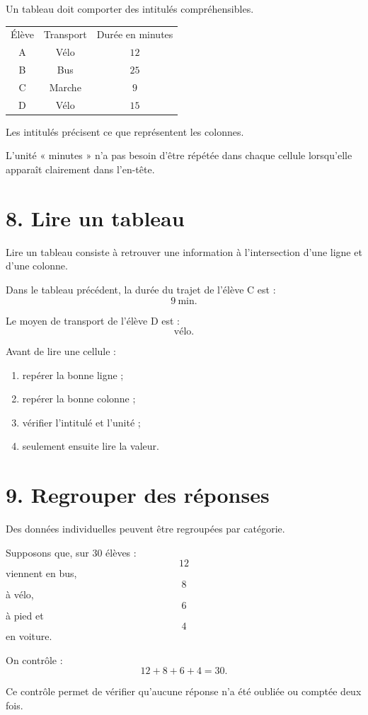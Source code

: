 Un tableau doit comporter des intitulés compréhensibles.

\begin{tabular}{c|c|c}
Élève & Transport & Durée en minutes \\
A & Vélo & $12$ \\
B & Bus & $25$ \\
C & Marche & $9$ \\
D & Vélo & $15$ \\
\end{tabular}

Les intitulés précisent ce que représentent les colonnes.

L'unité « minutes » n'a pas besoin d'être répétée dans chaque cellule lorsqu'elle apparaît clairement dans l'en-tête.

\section{8. Lire un tableau}

Lire un tableau consiste à retrouver une information à l'intersection d'une ligne et d'une colonne.

Dans le tableau précédent, la durée du trajet de l'élève C est :
\[
9\ \text{min}.
\]

Le moyen de transport de l'élève D est :
\[
\text{vélo}.
\]

\begin{methode}
Avant de lire une cellule :
\begin{enumerate}
\item repérer la bonne ligne ;
\item repérer la bonne colonne ;
\item vérifier l'intitulé et l'unité ;
\item seulement ensuite lire la valeur.
\end{enumerate}
\end{methode}

\section{9. Regrouper des réponses}

Des données individuelles peuvent être regroupées par catégorie.

Supposons que, sur $30$ élèves :
\[
12
\]
viennent en bus,
\[
8
\]
à vélo,
\[
6
\]
à pied et
\[
4
\]
en voiture.

On contrôle :
\[
12+8+6+4=30.
\]

Ce contrôle permet de vérifier qu'aucune réponse n'a été oubliée ou comptée deux fois.

